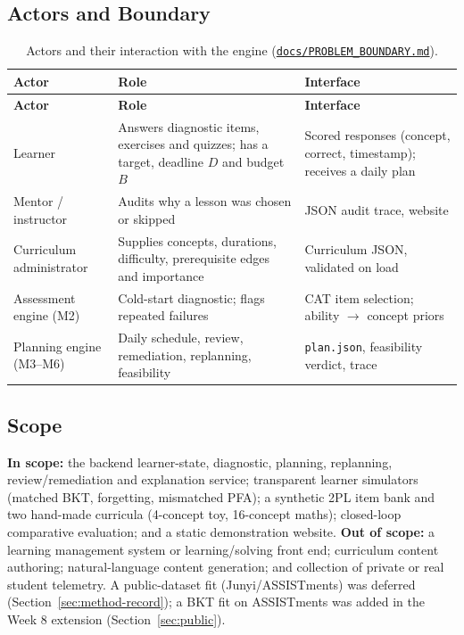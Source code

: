 \documentclass[english]{sintr}
\newcommand{\repourl}{https://github.com/Bhuvan-56/adaptive-learning-path-planner-DAT}
\newcommand{\sha}{cs5903-final-2026}
\DeclareRobustCommand{\rf}[1]{\href{\repourl/blob/\sha/#1}{\nolinkurl{#1}}}
\begin{document}
\subsection{Actors and Boundary}
{\small
\begin{longtable}{|L{3.14cm}|L{6.09cm}|L{5.80cm}|}
\caption{Actors and their interaction with the engine (\rf{docs/PROBLEM_BOUNDARY.md}).}\\
\hline
\textbf{Actor} & \textbf{Role} & \textbf{Interface} \\ \hline
\endfirsthead
\hline \textbf{Actor} & \textbf{Role} & \textbf{Interface} \\ \hline
\endhead
Learner & Answers diagnostic items, exercises and quizzes; has a target, deadline $D$ and budget $B$ & Scored responses (concept, correct, timestamp); receives a daily plan \\ \hline
Mentor / instructor & Audits why a lesson was chosen or skipped & JSON audit trace, website \\ \hline
Curriculum administrator & Supplies concepts, durations, difficulty, prerequisite edges and importance & Curriculum JSON, validated on load \\ \hline
Assessment engine (M2) & Cold-start diagnostic; flags repeated failures & CAT item selection; ability $\rightarrow$ concept priors \\ \hline
Planning engine (M3--M6) & Daily schedule, review, remediation, replanning, feasibility & \texttt{plan.json}, feasibility verdict, trace \\ \hline
\end{longtable}
}

\subsection{Scope}
\textbf{In scope:} the backend learner-state, diagnostic, planning, replanning, review/remediation and explanation service; transparent learner simulators (matched BKT, forgetting, mismatched PFA); a synthetic 2PL item bank and two hand-made curricula (4-concept toy, 16-concept maths); closed-loop comparative evaluation; and a static demonstration website.
\vspace{0.2em}\newline
\textbf{Out of scope:} a learning management system or learning/solving front end; curriculum content authoring; natural-language content generation; and collection of private or real student telemetry. A public-dataset fit (Junyi/ASSISTments) was deferred (Section~\ref{sec:method-record}); a BKT fit on ASSISTments was added in the Week 8 extension (Section~\ref{sec:public}).
\end{document}
